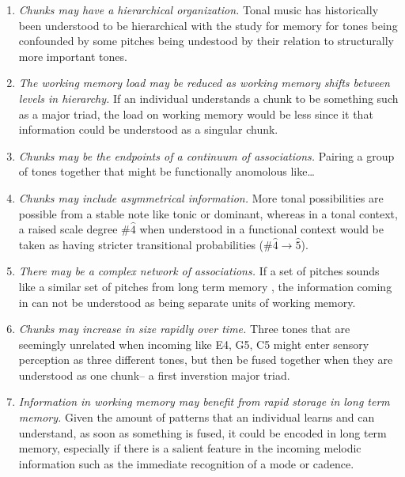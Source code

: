 \documentclass[]{book}
\providecommand{\tightlist}{%
  \setlength{\itemsep}{0pt}\setlength{\parskip}{0pt}}
\begin{document}
\begin{enumerate}
\def\labelenumi{\arabic{enumi}.}
\tightlist
\item
  \emph{Chunks may have a hierarchical organization.} Tonal music has historically been understood to be hierarchical \citep{krumhanslCognitiveFoundationsMusical2001, meyerEmotionMeaningMusic1956, schenkerFreieSatz1935} with the study for memory for tones being confounded by some pitches being undestood by their relation to structurally more important tones.
\item
  \emph{The working memory load may be reduced as working memory shifts between levels in hierarchy.} If an individual understands a chunk to be something such as a major triad, the load on working memory would be less since it that information could be understood as a singular chunk.
\item
  \emph{Chunks may be the endpoints of a continuum of associations.} Pairing a group of tones together that might be functionally anomolous like\ldots{}
\item
  \emph{Chunks may include asymmetrical information.} More tonal possibilities are possible from a stable note like tonic or dominant, whereas in a tonal context, a raised scale degree \#\(\hat{4}\) when understood in a functional context would be taken as having stricter transitional probabilities (\#\(\hat{4} \rightarrow \hat{5}\)).
\item
  \emph{There may be a complex network of associations.} If a set of pitches sounds like a similar set of pitches from long term memory , the information coming in can not be understood as being separate units of working memory.
\item
  \emph{Chunks may increase in size rapidly over time.} Three tones that are seemingly unrelated when incoming like E4, G5, C5 might enter sensory perception as three different tones, but then be fused together when they are understood as one chunk-- a first inverstion major triad.
\item
  \emph{Information in working memory may benefit from rapid storage in long term memory.} Given the amount of patterns that an individual learns and can understand, as soon as something is fused, it could be encoded in long term memory, especially if there is a salient feature in the incoming melodic information such as the immediate recognition of a mode or cadence.
\end{enumerate}
\end{document}
